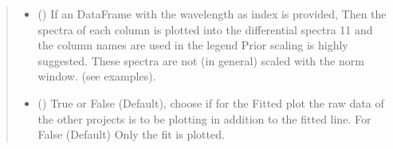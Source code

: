 \documentclass[letterpaper,10pt,english]{sphinxmanual}
\begin{document}
\begin{fulllineitems}
\begin{fulllineitems}
\begin{quote}
\begin{description}
\begin{itemize}
\item {} 
 (\sphinxstyleliteralemphasis{\sphinxupquote{, }}) \textendash{} If an DataFrame with the wavelength as index is provided, Then the spectra of each column
is plotted into the differential spectra 1\sphinxhyphen{}1 and the column names are used in the legend
Prior scaling is highly suggested. These spectra are not (in general) scaled with the
norm window. (see examples).

\item {} 
 (\sphinxstyleliteralemphasis{\sphinxupquote{, }}) \textendash{} True or False (Default), choose if for the Fitted plot the raw data of the
other projects is to be plotting in addition to the fitted line. For False (Default)
Only the fit is plotted.


\end{itemize}
\end{description}
\end{quote}
\end{fulllineitems}
\end{fulllineitems}
\end{document}
